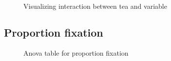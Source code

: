 \documentclass{article}
\begin{document}
\begin{figure}[H]
  \caption{Visualizing interaction between tea and variable}
  \noindent{}
  \centering
\end{figure}

\subsection{Proportion fixation}


\begin{figure}[H]
  \caption{Anova table for proportion fixation}
  \noindent{}
  \centering
\end{figure}
\end{document}
